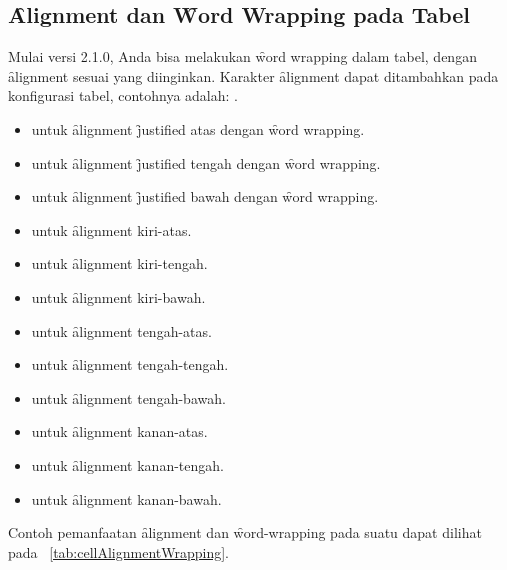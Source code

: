 \subsection{\f{Alignment} dan \f{Word Wrapping} pada Tabel}
\label{sec:cellAlignmentAndWordWrap}

Mulai versi 2.1.0, Anda bisa melakukan \f{word wrapping} dalam tabel, dengan \f{alignment} sesuai yang diinginkan.
Karakter \f{alignment} dapat ditambahkan pada konfigurasi tabel, contohnya adalah: .

\begin{itemize}
	\item {} untuk \f{alignment} \f{justified} atas dengan \f{word wrapping}.
	\item {} untuk \f{alignment} \f{justified} tengah dengan \f{word wrapping}.
	\item {} untuk \f{alignment} \f{justified} bawah dengan \f{word wrapping}.
	\item {} untuk \f{alignment} kiri-atas.
	\item {} untuk \f{alignment} kiri-tengah.
	\item {} untuk \f{alignment} kiri-bawah.
	\item {} untuk \f{alignment} tengah-atas.
	\item {} untuk \f{alignment} tengah-tengah.
	\item {} untuk \f{alignment} tengah-bawah.
	\item {} untuk \f{alignment} kanan-atas.
	\item {} untuk \f{alignment} kanan-tengah.
	\item {} untuk \f{alignment} kanan-bawah.
\end{itemize}

Contoh pemanfaatan \f{alignment} dan \f{word-wrapping} pada suatu  dapat dilihat pada \tab~\ref{tab:cellAlignmentWrapping}.

